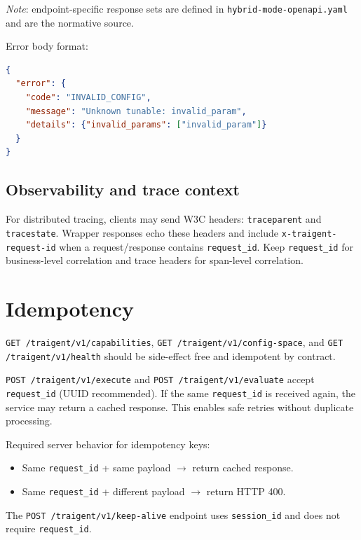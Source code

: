 \documentclass[11pt,a4paper]{article}
\newcommand{\field}[1]{\texttt{#1}}
\begin{document}
\textit{Note}: endpoint-specific response sets are defined in
\texttt{hybrid-mode-openapi.yaml} and are the normative source.

Error body format:

\begin{lstlisting}[language=json]
{
  "error": {
    "code": "INVALID_CONFIG",
    "message": "Unknown tunable: invalid_param",
    "details": {"invalid_params": ["invalid_param"]}
  }
}
\end{lstlisting}

\subsection{Observability and trace context}

For distributed tracing, clients may send W3C headers:
\texttt{traceparent} and \texttt{tracestate}. Wrapper responses echo these
headers and include \texttt{x-traigent-request-id} when a request/response
contains \field{request\_id}. Keep \field{request\_id} for business-level
correlation and trace headers for span-level correlation.

\section{Idempotency}

\texttt{GET /traigent/v1/capabilities}, \texttt{GET /traigent/v1/config-space}, and
\texttt{GET /traigent/v1/health} should be side-effect free and idempotent by contract.

\texttt{POST /traigent/v1/execute} and \texttt{POST /traigent/v1/evaluate} accept \field{request\_id}
(UUID recommended). If the same \field{request\_id} is received again, the
service may return a cached response. This enables safe retries without
duplicate processing.

Required server behavior for idempotency keys:
\begin{itemize}[nosep]
  \item Same \field{request\_id} + same payload $\rightarrow$ return cached response.
  \item Same \field{request\_id} + different payload $\rightarrow$ return HTTP 400.
\end{itemize}

The \texttt{POST /traigent/v1/keep-alive} endpoint uses \field{session\_id} and does not
require \field{request\_id}.
\end{document}
